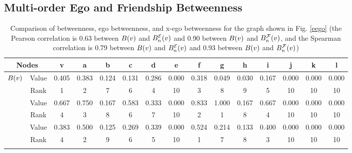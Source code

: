 \subsection{Multi-order Ego and Friendship Betweenness}\label{betweenness-sub}
\begin{center}
\begin{table}[t]
 \caption{Comparison of betweenness, ego betweenness, and x-ego betweenness for the graph shown in Fig. \ref{eego} (the Pearson correlation is 0.63 between $B({v})$ and $\BE{n}{v}$ and 0.90 between $B({v})$ and $\BF{n}{v}$, and the Spearman correlation is 0.79 between $B({v})$ and $\BE{n}{v}$ and 0.93 between $B({v})$ and $\BF{n}{v}$)}\label{comparison}
 \resizebox{17.4cm}{!} {
 \begin{tabular}{|c|c|c|c|c|c|c|c|c|c|c|c|c|c|c|}
 \hline
\multicolumn{2}{|c|}{Nodes} & v & a & b & c & d & e & f & g & h & i & j & k & l \\
 \hline
\multirow{2}{*}{$B({v})$} & Value & 0.405 & 0.383 & 0.124 & 0.131 & 0.286 & 0.000 & 0.318 & 0.049 & 0.030 & 0.167 & 0.000 & 0.000 & 0.000\\
\hhline{~--------------}
& Rank & 1 & 2 & 7 & 6 & 4 & 10 & 3 & 8 & 9 & 5 & 10 & 10 & 10\\
\hhline{---------------}
\multirow{2}{*}{$\BE{n}{v}$} & Value & 0.667 & 0.750 & 0.167 & 0.583 & 0.333 & 0.000 & 0.833 & 1.000 & 0.167 & 0.667 & 0.000 & 0.000 & 0.000\\
\hhline{~--------------}
& Rank & 4 & 3 & 8 & 6 & 7 & 10 & 2 & 1 & 8 & 4 & 10 & 10 & 10\\
\hhline{---------------}
\multirow{2}{*}{$\BF{n}{v}$} & Value & 0.383 & 0.500 & 0.125 & 0.269 & 0.339 & 0.000 & 0.524 & 0.214 & 0.133 & 0.400 & 0.000 & 0.000 & 0.000\\
\hhline{~--------------}
& Rank & 4 & 2 & 9 & 6 & 5 & 10 & 1 & 7 & 8 & 3 & 10 & 10 & 10\\
\hhline{---------------}
 \hline
 \end{tabular}
}
\end{table}
\end{center}
